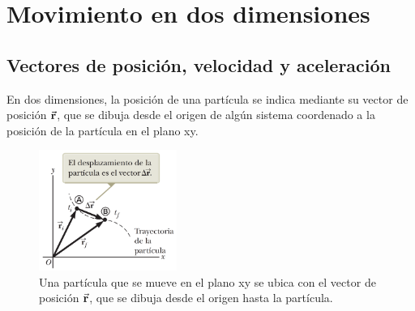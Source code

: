 \section{Movimiento en dos dimensiones}
  \subsection{Vectores de posición, velocidad y aceleración}
    \PN En dos dimensiones, la posición de una partícula se indica mediante su vector de posición $\vec{\mathbf{r}}$, que se
    dibuja desde el origen de algún sistema coordenado a la posición de la partícula en el plano xy.

    \begin{figure}[H]
    \centering
      \includegraphics[width=0.4\textwidth]{1/figure_1}
      \caption{Una partícula que se mueve en el plano xy se ubica con el vector de posición $\vec{\mathbf{r}}$, que se dibuja
      desde el origen hasta la partícula.}
    \end{figure}


